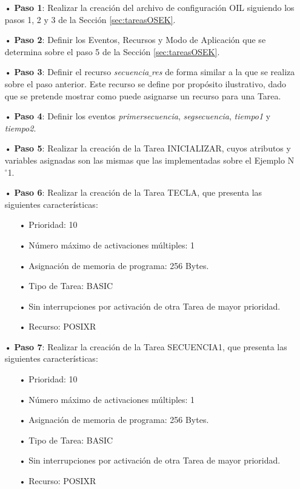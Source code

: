 \documentclass[12pt,letterpaper]{article}
\begin{document}
\begin{enumerate}
\item[•]\textbf{Paso 1}: Realizar la creación del archivo de configuración OIL siguiendo los pasos 1, 2 y 3 de la Sección \ref{sec:tareasOSEK}.
\item[•]\textbf{Paso 2}: Definir los Eventos, Recursos y Modo de Aplicación que se determina sobre el paso 5 de la Sección \ref{sec:tareasOSEK}.
\item[•]\textbf{Paso 3}: Definir el recurso \textit{secuencia$\_$res} de forma similar a la que se realiza sobre el paso anterior. Este recurso se define por propósito ilustrativo, dado que se pretende mostrar como puede asignarse un recurso para una Tarea.
\item[•]\textbf{Paso 4}: Definir los eventos \textit{primersecuencia}, \textit{segsecuencia}, \textit{tiempo1} y \textit{tiempo2}.
\item[•]\textbf{Paso 5}: Realizar la creación de la Tarea INICIALIZAR, cuyos atributos y variables asignadas son las mismas que las implementadas sobre el Ejemplo N$^{\circ}$1.
\item[•]\textbf{Paso 6}: Realizar la creación de la Tarea TECLA, que presenta las siguientes características:
\begin{enumerate}
\item[•]Prioridad: 10
\item[•]Número máximo de activaciones múltiples: 1
\item[•]Asignación de memoria de programa: 256 Bytes.
\item[•]Tipo de Tarea: BASIC
\item[•]Sin interrupciones por activación de otra Tarea de mayor prioridad.
\item[•]Recurso: POSIXR
\end{enumerate}
\item[•]\textbf{Paso 7}: Realizar la creación de la Tarea SECUENCIA1, que presenta las siguientes características:
\begin{enumerate}
\item[•]Prioridad: 10
\item[•]Número máximo de activaciones múltiples: 1
\item[•]Asignación de memoria de programa: 256 Bytes.
\item[•]Tipo de Tarea: BASIC
\item[•]Sin interrupciones por activación de otra Tarea de mayor prioridad.
\item[•]Recurso: POSIXR
\end{enumerate}
\end{enumerate}
\end{document}
